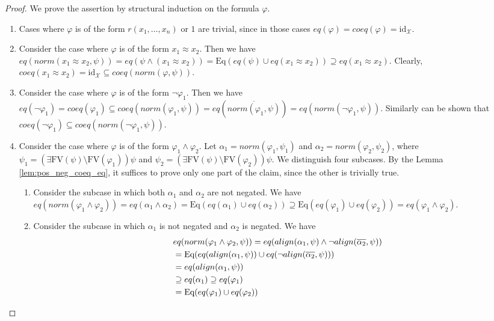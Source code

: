 \documentclass{lmcs}
\def\X{\mathcal X}
\def\norm{norm}
\def\eq{eq}
\def\coeq{coeq}
\def\al{align}
\def\id{\textrm{id}}
\def\Eq{{\textrm{Eq}}}
\def\FV{\textrm{FV}}
\begin{document}
\begin{proof}
We prove the assertion by structural induction on the formula $\varphi$.
\begin{enumerate}
\item Cases where $\varphi$ is of the form $r(x_1,\ldots,x_n)$ or $1$ are trivial, since in those cases $\eq(\varphi)=\coeq(\varphi)=\id_\X$.
\item Consider the case where $\varphi$ is of the form $x_1\approx x_2$. Then we have $\eq(\norm(x_1\approx x_2,\psi))=\eq(\psi\wedge(x_1\approx x_2))=\Eq(\eq(\psi)\cup\eq(x_1\approx x_2))\supseteq\eq(x_1\approx x_2)$. Clearly, $\coeq(x_1\approx x_2)=\id_\X\subseteq\coeq(\norm(\varphi,\psi))$.
\item Consider the case where $\varphi$ is of the form $\neg\varphi_1$. Then we have $\eq(\neg\varphi_1)=\coeq(\varphi_1)\subseteq\coeq(\norm(\varphi_1,\psi))=\eq(\overline{\norm(\varphi_1,\psi)})=\eq(\norm(\neg\varphi_1,\psi))$. Similarly can be shown that $\coeq(\neg\varphi_1)\subseteq\coeq(\norm(\neg\varphi_1,\psi))$.
\item Consider the case where $\varphi$ is of the form $\varphi_1\wedge\varphi_2$. Let $\alpha_1=\norm(\varphi_1,\psi_1)$ and $\alpha_2=\norm(\varphi_2,\psi_2)$, where $\psi_1=(\exists\FV(\psi)\setminus\FV(\varphi_1))\psi$ and $\psi_2=(\exists\FV(\psi)\setminus\FV(\varphi_2))\psi$. We distinguish four subcases. By the Lemma \ref{lem:pos_neg_coeq_eq}, it suffices to prove only one part of the claim, since the other is trivially true.
\begin{enumerate}
\item Consider the subcase in which both $\alpha_1$ and $\alpha_2$ are not negated. We have $\eq(\norm(\varphi_1\wedge\varphi_2))=\eq(\alpha_1\wedge\alpha_2)=\Eq(\eq(\alpha_1)\cup\eq(\alpha_2))\supseteq\Eq(\eq(\varphi_1)\cup\eq(\varphi_2))=\eq(\varphi_1\wedge\varphi_2)$.
\item Consider the subcase in which $\alpha_1$ is not negated and $\alpha_2$ is negated. We have 
\begin{align}
&\eq(\norm(\varphi_1\wedge\varphi_2,\psi))=\eq(\al(\alpha_1,\psi)\wedge\neg\al(\overline{\alpha_2},\psi))\notag\\
&=\Eq(\eq(\al(\alpha_1,\psi))\cup\eq(\neg\al(\overline{\alpha_2},\psi))) \notag\\
&=\eq(\al(\alpha_1,\psi))\label{eq:lem_eq_coeq_norm1}\\
&\supseteq\eq(\alpha_1)\supseteq\eq(\varphi_1)\notag\\
&=\Eq(\eq(\varphi_1)\cup\eq(\varphi_2))\label{eq:lem_eq_coeq_norm2}\\

\end{align}
\end{enumerate}
\end{enumerate}
\end{proof}
\end{document}

